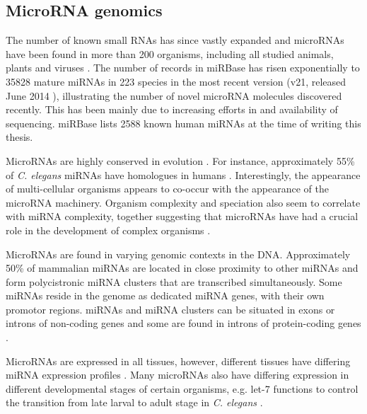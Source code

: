 \subsection{MicroRNA genomics}\label{microrna-genomics}

The number of known small RNAs has since vastly expanded and microRNAs have
been found in more than 200 organisms, including all studied animals, plants
\citep{JonesRhoades2006} and viruses \citep{Grundhoff2011}. The number of
records in miRBase has risen exponentially
to 35828 mature miRNAs in 223 species in the most recent
version (v21, released June 2014 \citep{MiRBaseWeb}), illustrating
the number of novel microRNA molecules discovered recently. This has been mainly due to
increasing efforts in and availability of sequencing. miRBase lists 2588 known
human miRNAs at the time of writing this thesis.

MicroRNAs are highly conserved in evolution \citep{Bartel2004}. For instance,
approximately 55\% of \emph{C. elegans} miRNAs have homologues in humans
\citep{IbanezVentoso2008}. Interestingly, the
appearance of multi-cellular organisms appears to co-occur with the appearance
of the microRNA machinery. Organism complexity and speciation also seem to
correlate with miRNA complexity, together suggesting that microRNAs have had a
crucial role in the development of complex organisms \citep{Lee2007}.

MicroRNAs are found in varying genomic contexts in the DNA. Approximately 50\% of
mammalian miRNAs are located in close proximity to other miRNAs and form
polycistronic miRNA clusters that are transcribed simultaneously. Some miRNAs
reside in the genome as dedicated miRNA genes, with their own promotor regions.
\citep{Kim2009} miRNAs and miRNA clusters can be situated in exons or
introns of non-coding genes and some are found in introns of protein-coding genes
\citep{Du2005}.

MicroRNAs are expressed in all tissues, however, different tissues have
differing miRNA expression profiles \citep{Krol2010}. Many microRNAs also have
differing expression in different developmental stages of certain organisms, e.g.
let-7 functions to control the transition from late larval to adult stage in
\emph{C. elegans} \citep{Bartel2004}.

